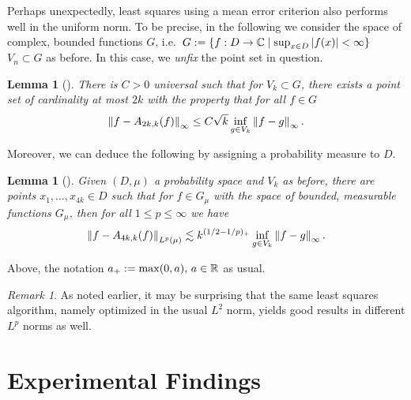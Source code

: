 \documentclass[12pt, oneside]{amsart}
\newtheorem{lem}[thm]{Lemma}
\theoremstyle{definition}
\theoremstyle{remark}
\newtheorem{remark}[thm]{Remark}
\numberwithin{equation}{section}
\begin{document}
Perhaps unexpectedly, least squares using a mean error criterion also performs well in the uniform norm. To be precise, in the following we consider the space of complex, bounded functions \(G\), i.e.\ \(G \defn \set{f: D \to \C \mid \sup_{x \in D} \abs{f(x)} < \infty}\) \(V_n \subset G\) as before. In this case, we \emph{unfix} the point set in question.

\begin{lem}[\cite{krieg2024samplingprojectionsuniformnorm}]
	There is \(C > 0\) universal such that for \(V_k \subset G\), there exists a point set of cardinality at most \(2k\) with the property that for all \(f \in G\) \[
		\norm[\infty]{f - A_{2k, k} (f)} \leq C \sqrt{k} \inf_{g \in V_k} \norm[\infty]{f-g}.
	\]
\end{lem}
Moreover, we can deduce the following by assigning a probability measure to \(D\).
\begin{lem}[\cite{krieg2024samplingprojectionsuniformnorm}]
	Given \((D, \mu)\) a probability space and \(V_k\) as before, there are points \(x_1, \dots, x_{4k} \in D\) such that for \(f \in G_\mu\) with the space of bounded, measurable functions \(G_\mu\), then for all \(1 \leq p \leq \infty\) we have \[
		\norm[L^p(\mu)]{f - A_{4k, k}(f)} \lesssim k^{(1/2-1/p)_+} \inf_{g \in V_k} \norm[\infty]{f-g}.
	\]
\end{lem}
Above, the notation \(a_+ \defn \max(0, a),\, a \in \R\) as usual.
\begin{remark}
	As noted earlier, it may be surprising that the same least squares algorithm, namely optimized in the usual \(L^2\) norm, yields good results in different \(L^p\) norms as well.
\end{remark}

\section{Experimental Findings}\label{sec:experimentalFindings}

\end{document}
